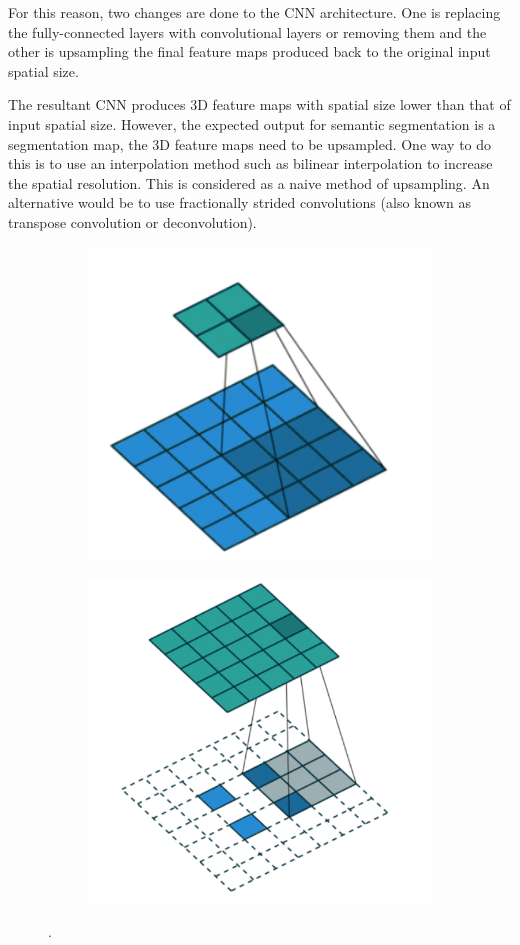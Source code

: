 For this reason, two changes are done to the CNN architecture. One is replacing the fully-connected layers with convolutional layers or removing them and the other is upsampling the final feature maps produced back to the original input spatial size. 

The resultant CNN produces 3D feature maps with spatial size lower than that of input spatial size. However, the expected output for semantic segmentation is a segmentation map, the 3D feature maps need to be upsampled. One way to do this is to use an interpolation method such as bilinear interpolation to increase the spatial resolution. This is considered as a naive method of upsampling. An alternative would be to use fractionally strided convolutions (also known as transpose convolution or deconvolution). 

	\begin{figure}[h]
	\centering
		\begin{subfigure}{.45\textwidth}
  			\centering
  			\includegraphics[width=.7\linewidth]{images/reg_conv}
  			\caption{}
  			\label{Fig:tranconva}
		\end{subfigure}
		\begin{subfigure}{.45\textwidth}
  			\centering
  			\includegraphics[width=.7\linewidth]{images/tran_conv}
  			\caption{}
  			\label{Fig:tranconvb}
		\end{subfigure}
		\caption{ \cite{diff_conv}.}
		\label{Fig:tranconv}
	\end{figure}
